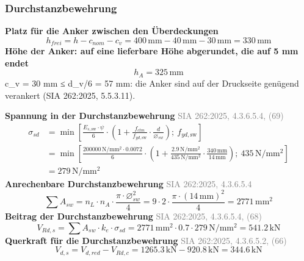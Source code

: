 \documentclass[11pt,a4paper]{article}
\newcommand{\normref}[1]{{\small\textcolor{gray}{#1}}}
\begin{document}
\subsubsection{Durchstanzbewehrung}
\noindent\textbf{Platz für die Anker zwischen den Überdeckungen}
\begin{equation*}
h_{frei} = h - c_{nom} - c_v = 400\,\mathrm{mm} - 40\,\mathrm{mm} - 30\,\mathrm{mm} = 330\,\mathrm{mm}
\end{equation*}
\noindent\textbf{Höhe der Anker: auf eine lieferbare Höhe abgerundet, die auf 5 mm endet}
\begin{equation*}
h_A = 325\,\mathrm{mm}
\end{equation*}
c\_v = 30 mm ≤ d\_v/6 = 57 mm: die Anker sind auf der Druckseite genügend verankert (SIA 262:2025, 5.5.3.11).

\noindent\textbf{Spannung in der Durchstanzbewehrung} \hfill \normref{SIA 262:2025, 4.3.6.5.4, (69)}
\begin{equation*}
\begin{aligned}
  \sigma_{sd} &= \min\left[\frac{E_{s,\text{sw}} \cdot \psi}{6} \cdot \left(1 + \frac{f_{ctm}}{f_{yd,\text{sw}}} \cdot \frac{d}{\varnothing_{sw}}\right);\ f_{yd,\text{sw}}\right] \\
  &= \min\left[\frac{200000\,\mathrm{N}/\mathrm{mm}^{2} \cdot 0.0072}{6} \cdot \left(1 + \frac{2.9\,\mathrm{N}/\mathrm{mm}^{2}}{435\,\mathrm{N}/\mathrm{mm}^{2}} \cdot \frac{340\,\mathrm{mm}}{14\,\mathrm{mm}}\right);\ 435\,\mathrm{N}/\mathrm{mm}^{2}\right] \\
  &= 279\,\mathrm{N}/\mathrm{mm}^{2}
\end{aligned}
\end{equation*}
\noindent\textbf{Anrechenbare Durchstanzbewehrung} \hfill \normref{SIA 262:2025, 4.3.6.5.4}
\begin{equation*}
\sum A_{sw} = n_L \cdot n_A \cdot \frac{\pi \cdot \varnothing_{sw}^{2}}{4} = 9 \cdot 2 \cdot \frac{\pi \cdot \left(14\,\mathrm{mm}\right)^{2}}{4} = 2771\,\mathrm{mm}^{2}
\end{equation*}
\noindent\textbf{Beitrag der Durchstanzbewehrung} \hfill \normref{SIA 262:2025, 4.3.6.5.4, (68)}
\begin{equation*}
V_{Rd,s} = \sum A_{sw} \cdot k_e \cdot \sigma_{sd} = 2771\,\mathrm{mm}^{2} \cdot 0.7 \cdot 279\,\mathrm{N}/\mathrm{mm}^{2} = 541.2\,\mathrm{kN}
\end{equation*}
\noindent\textbf{Querkraft für die Durchstanzbewehrung} \hfill \normref{SIA 262:2025, 4.3.6.5.2, (66)}
\begin{equation*}
V_{d,s} = V_{d,red} - V_{Rd,c} = 1265.3\,\mathrm{kN} - 920.8\,\mathrm{kN} = 344.6\,\mathrm{kN}
\end{equation*}
\end{document}
